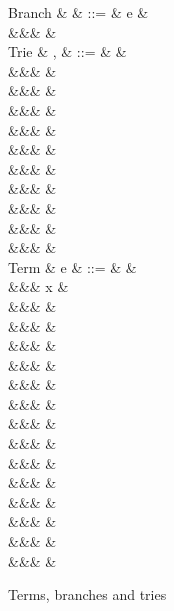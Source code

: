 \begin{figure}
\begin{syntaxfig}
\mbox{Branch}
&
\kappa
&
::=
&
e
&
\\
&&&
\sigma
&
\\[2mm]
\mbox{Trie}
&
\sigma, \tau
&
::=
&
&
\\
&&&
&
\\
&&&
\trieUnit{\kappa}
&
\\
&&&
\trieUnitProj{\kappa}
&
\\
&&&
\trieSum{\sigma}{\tau}
&
\\
&&&
\trieSumProjL{\sigma}{\tau}
&
\\
&&&
\trieSumProjR{\sigma}{\tau}
&
\\
&&&
\trieProd{\sigma}
&
\\
&&&
\trieProdProj{\sigma}
&
\\
&&&
\trieRoll{\sigma}
&
\\
&&&
\trieRollProj{\sigma}
&
\\[2mm]
\mbox{Term}
&
e
&
::=
&
&
\\
&&&
x
&
\\
&&&
\exUnit
&
\\
&&&
&
\\
&&&
&
\\
&&&
&
\\
&&&
&
\\
&&&
&
\\
&&&
&
\\
&&&
&
\\
&&&
\exFun{\sigma}
&
\\
&&&
\exFunProj{\trieSingletonProj{\sigma}{\exFun{\tau}}}
&
\\
&&&
&
\\
&&&
&
\\
&&&
&
\\
&&&
&
\end{syntaxfig}
\caption{Terms, branches and tries}
\end{figure}
